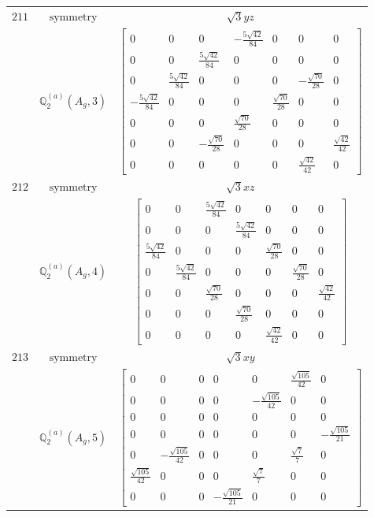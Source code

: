\documentclass[fleqn,8pt,landscape]{jsarticle}
\begin{document}
\begin{longtable}{ccc}
$ 211 $ & $ \text{symmetry} $ & $ \sqrt{3} y z $ \\
$  $ & $ \mathbb{Q}_{2}^{(a)}(A_{g},3) $ & $ \begin{bmatrix} 0 & 0 & 0 & - \frac{5 \sqrt{42}}{84} & 0 & 0 & 0 \\ 0 & 0 & \frac{5 \sqrt{42}}{84} & 0 & 0 & 0 & 0 \\ 0 & \frac{5 \sqrt{42}}{84} & 0 & 0 & 0 & - \frac{\sqrt{70}}{28} & 0 \\ - \frac{5 \sqrt{42}}{84} & 0 & 0 & 0 & \frac{\sqrt{70}}{28} & 0 & 0 \\ 0 & 0 & 0 & \frac{\sqrt{70}}{28} & 0 & 0 & 0 \\ 0 & 0 & - \frac{\sqrt{70}}{28} & 0 & 0 & 0 & \frac{\sqrt{42}}{42} \\ 0 & 0 & 0 & 0 & 0 & \frac{\sqrt{42}}{42} & 0 \end{bmatrix} $ \\ \hline
$ 212 $ & $ \text{symmetry} $ & $ \sqrt{3} x z $ \\
$  $ & $ \mathbb{Q}_{2}^{(a)}(A_{g},4) $ & $ \begin{bmatrix} 0 & 0 & \frac{5 \sqrt{42}}{84} & 0 & 0 & 0 & 0 \\ 0 & 0 & 0 & \frac{5 \sqrt{42}}{84} & 0 & 0 & 0 \\ \frac{5 \sqrt{42}}{84} & 0 & 0 & 0 & \frac{\sqrt{70}}{28} & 0 & 0 \\ 0 & \frac{5 \sqrt{42}}{84} & 0 & 0 & 0 & \frac{\sqrt{70}}{28} & 0 \\ 0 & 0 & \frac{\sqrt{70}}{28} & 0 & 0 & 0 & \frac{\sqrt{42}}{42} \\ 0 & 0 & 0 & \frac{\sqrt{70}}{28} & 0 & 0 & 0 \\ 0 & 0 & 0 & 0 & \frac{\sqrt{42}}{42} & 0 & 0 \end{bmatrix} $ \\ \hline
$ 213 $ & $ \text{symmetry} $ & $ \sqrt{3} x y $ \\
$  $ & $ \mathbb{Q}_{2}^{(a)}(A_{g},5) $ & $ \begin{bmatrix} 0 & 0 & 0 & 0 & 0 & \frac{\sqrt{105}}{42} & 0 \\ 0 & 0 & 0 & 0 & - \frac{\sqrt{105}}{42} & 0 & 0 \\ 0 & 0 & 0 & 0 & 0 & 0 & 0 \\ 0 & 0 & 0 & 0 & 0 & 0 & - \frac{\sqrt{105}}{21} \\ 0 & - \frac{\sqrt{105}}{42} & 0 & 0 & 0 & \frac{\sqrt{7}}{7} & 0 \\ \frac{\sqrt{105}}{42} & 0 & 0 & 0 & \frac{\sqrt{7}}{7} & 0 & 0 \\ 0 & 0 & 0 & - \frac{\sqrt{105}}{21} & 0 & 0 & 0 \end{bmatrix} $ \\ \hline

\end{longtable}
\end{document}

